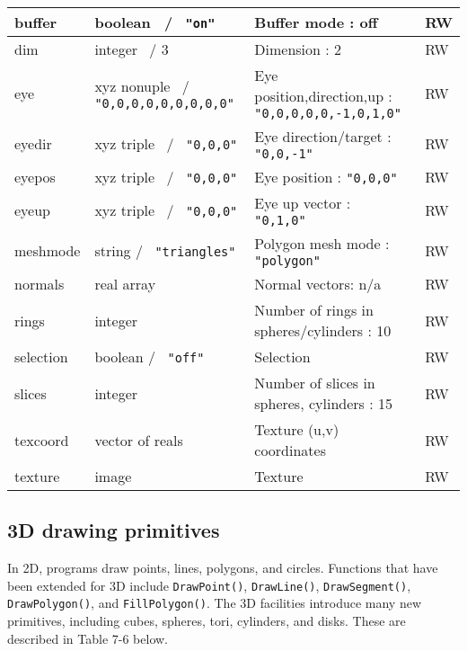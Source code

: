 \begin{center}
\begin{xtabular}{|m{1.076in}|m{1.5in}|m{2.58in}|m{0.448in}|}
buffer &
boolean \ / \texttt{ "on" } &
Buffer mode : off &
RW\\\hline
dim &
integer \ / 3 &
Dimension : 2 &
RW\\\hline
eye &
xyz nonuple \ / \texttt{ "0,0,0,0,0,0,0,0,0"} &
Eye position,direction,up : {\tt "0,0,0,0,0,-1,0,1,0"} &
RW\\\hline
eyedir &
xyz triple \ / \texttt{ "0,0,0"} &
Eye direction/target : \texttt{ "0,0,-1"} &
RW\\\hline
eyepos &
xyz triple \ / \texttt{ "0,0,0" } &
Eye position : {\tt "0,0,0"} &
RW\\\hline
eyeup &
xyz triple \ / \texttt{ "0,0,0" } &
Eye up vector : \texttt{ "0,1,0" } &
RW\\\hline
meshmode &
string / \texttt{ "triangles"} &
Polygon mesh mode : \texttt{ "polygon" } &
RW\\\hline
normals &
real array  &
Normal vectors: n/a &
RW\\\hline
rings &
integer &
Number of rings in spheres/cylinders : 10 &
RW\\\hline
selection &
boolean / \texttt{ "off" } &
Selection &
RW\\\hline
slices &
integer &
Number of slices in spheres, cylinders : 15  &
RW\\\hline
texcoord &
vector of reals &
Texture (u,v) coordinates &
RW\\\hline
texture &
image &
Texture &
RW\\\hline
\end{xtabular}
\end{center}


\subsection*{3D drawing primitives}

In 2D, programs draw points, lines, polygons, and circles. Functions
that have been extended for 3D include \texttt{DrawPoint()},
\texttt{DrawLine()}, \texttt{DrawSegment()}, \texttt{DrawPolygon()},
and \texttt{FillPolygon()}. The 3D facilities introduce many new
primitives, including cubes, spheres, tori, cylinders, and
disks. These are described in Table 7-6 below.

